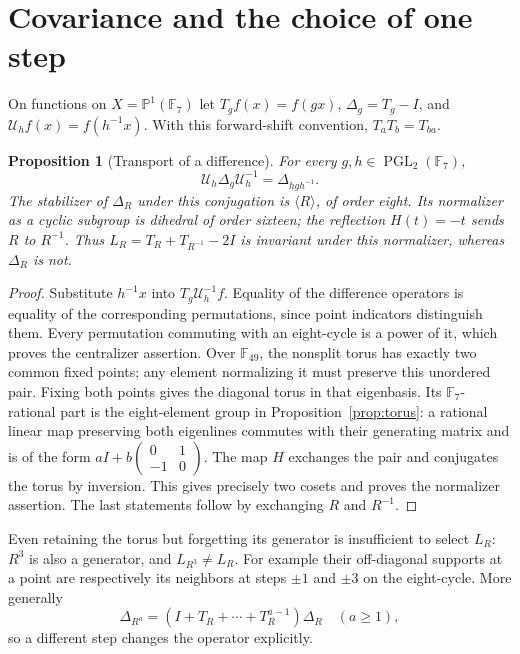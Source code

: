 \documentclass[11pt]{article}
\newtheorem{proposition}[theorem]{Proposition}
\theoremstyle{definition}
\theoremstyle{remark}
\newcommand{\F}{\mathbb F}
\newcommand{\PP}{\mathbb P}
\newcommand{\PGL}{\operatorname{PGL}}
\begin{document}
\section{Covariance and the choice of one step}\label{sec:covariance}
On functions on $X=\PP^1(\F_7)$ let $T_gf(x)=f(gx)$,
$\Delta_g=T_g-I$, and $\mathcal U_hf(x)=f(h^{-1}x)$.
With this forward-shift convention, $T_aT_b=T_{ba}$.
\begin{proposition}[Transport of a difference]\label{prop:covariance}
For every $g,h\in\PGL_2(\F_7)$,
\[
 \mathcal U_h\Delta_g\mathcal U_h^{-1}=\Delta_{hgh^{-1}}.
\]
The stabilizer of $\Delta_R$ under this conjugation is $\langle R\rangle$,
of order eight. Its normalizer as a cyclic subgroup is dihedral of order
sixteen; the reflection $H(t)=-t$ sends $R$ to $R^{-1}$.
Thus $L_R=T_R+T_{R^{-1}}-2I$ is invariant under this normalizer, whereas
$\Delta_R$ is not.
\end{proposition}
\begin{proof}
Substitute $h^{-1}x$ into $T_g\mathcal U_h^{-1}f$. Equality of the difference
operators is equality of the corresponding permutations, since point
indicators distinguish them. Every permutation commuting with an eight-cycle
is a power of it, which proves the centralizer assertion. Over $\F_{49}$,
the nonsplit torus has exactly two common fixed points; any element
normalizing it must preserve this unordered pair. Fixing both points gives
the diagonal torus in that eigenbasis. Its $\F_7$-rational part is the
eight-element group in Proposition~\ref{prop:torus}: a rational linear map
preserving both eigenlines commutes with their generating matrix and is of
the form $aI+b\left(\begin{smallmatrix}0&1\\-1&0\end{smallmatrix}\right)$.
The map $H$ exchanges the pair and conjugates the torus by inversion.
This gives precisely two cosets and proves the normalizer assertion.
The last statements follow by exchanging $R$ and $R^{-1}$.
\end{proof}

Even retaining the torus but forgetting its generator is insufficient to
select $L_R$: $R^3$ is also a generator, and $L_{R^3}\ne L_R$.
For example their off-diagonal supports at a point are respectively its
neighbors at steps $\pm1$ and $\pm3$ on the eight-cycle. More generally
\[
 \Delta_{R^a}=(I+T_R+\cdots+T_R^{a-1})\Delta_R\quad(a\ge1),
\]
so a different step changes the operator explicitly.
\end{document}
